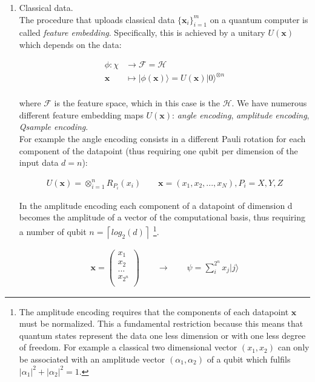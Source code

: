 \begin{enumerate}
    \item Classical data.\\
    The procedure that uploads classical data $\{\bm{x}_i\}_{i=1}^m$ on a quantum computer is called
    \textit{feature embedding}.
    Specifically, this is achieved by a unitary $U(\bm{x})$ which depends on the data:

    \begin{align}
        \phi : \chi &\rightarrow \mathcal{F} = \mathcal{H}\\
        \bm{x} &\mapsto |\phi(\bm{x})\rangle = U(\bm{x}) |0\rangle^{\otimes n}\\
    \end{align}

    where $\mathcal{F}$ is the feature space, which in this case is the $\mathcal{H}$.
    We have numerous different feature embedding maps $U(\bm{x})$: \textit{angle encoding}, \textit{amplitude encoding},
    \textit{Qsample encoding}.\\
    For example the angle encoding consists in a different Pauli rotation for each component of the datapoint
    (thus requiring one qubit per dimension of the input data $d = n$):

    \begin{align}
        U(\bm{x}) = \otimes_{i=1}^n R_{P_i}(x_i) 
        \qquad 
        \bm{x} = (x_1, x_2, ..., x_N), P_i = {X, Y, Z}
    \end{align}

    In the amplitude encoding each component of a datapoint of dimension d becomes the amplitude of a vector 
    of the computational basis, thus requiring a number of qubit $n = \left\lceil log_2(d) \right\rceil$
    \footnote[1]{
        The amplitude encoding requires that the components of each datapoint $\bm{x}$ must be normalized. 
        This a fundamental restriction because 
        this means that quantum states represent the data one less dimension or with one less degree of freedom.
        For example a classical two dimensional vector $(x_1, x_2)$ can only be associated with an amplitude 
        vector $(\alpha_1, \alpha_2)$ of a qubit which fulfils $|\alpha_1|^2 + |\alpha_2|^2 = 1$.
    }.

    \begin{align}
    \bm{x} = \begin{pmatrix}
        x_1 \\
        x_2 \\
        ... \\
        x_{2^n} \\
    \end{pmatrix}
    \qquad
    \rightarrow
    \qquad
    \psi = \sum_i^{2^n} x_j | j \rangle
    \end{align}


\end{enumerate}
